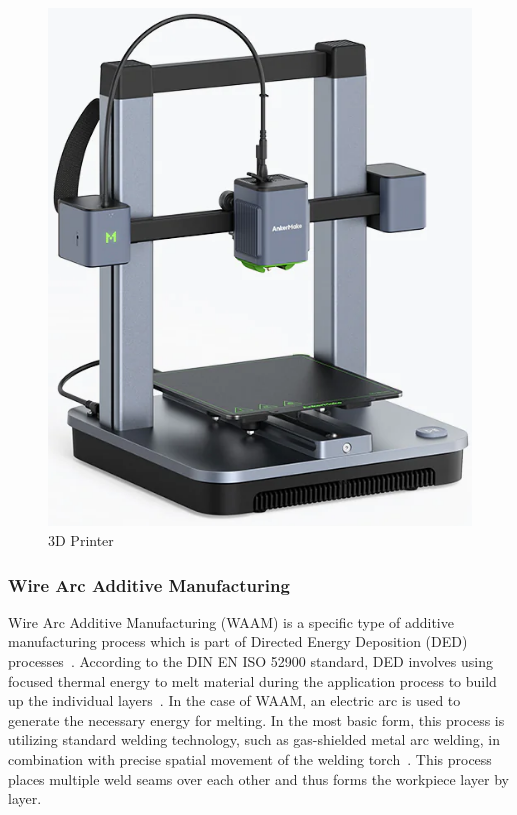 \begin{figure}[H]
	\centerline{\includegraphics[scale=.5]{figures/3Dprinter.png}}
	\caption{3D Printer~\cite{3D}}
	\label{3D}
\end{figure}

\subsubsection{Wire Arc Additive Manufacturing}
Wire Arc Additive Manufacturing (WAAM) is a specific type of additive manufacturing process which is part of Directed Energy Deposition (DED) processes~\cite{Svetlizky.2021}. According to the DIN EN ISO 52900 standard, DED involves using focused thermal energy to melt material during the application process to build up the individual layers~\cite{Additive}. In the case of WAAM, an electric arc is used to generate the necessary energy for melting. In the most basic form, this process is utilizing standard welding technology, such as gas-shielded metal arc welding, in combination with precise spatial movement of the welding torch~\cite{Cunningham.2018}. This process places multiple weld seams over each other and thus forms the workpiece layer by layer.

